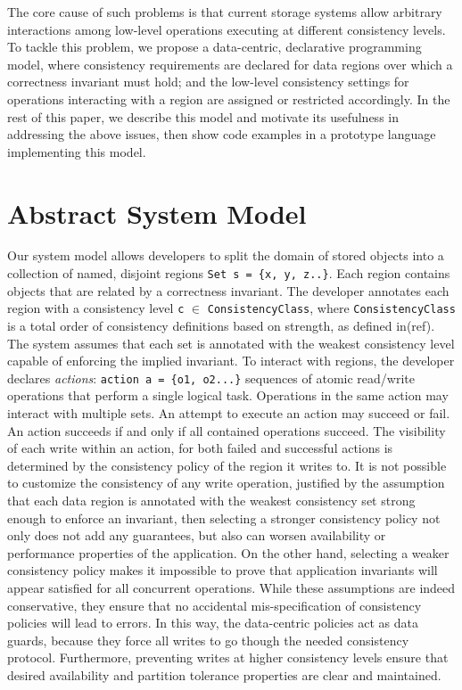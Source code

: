 \documentclass[preprint, numbers]{sigplanconf}
\begin{document}
The core cause of such problems is that current storage systems allow arbitrary
interactions among low-level operations executing at different consistency levels. To
tackle this problem, we propose a data-centric, declarative programming model, where
consistency requirements are declared for data regions over which a correctness
invariant must hold; and the low-level consistency settings for operations interacting with
a region are assigned or restricted accordingly. In the rest of this paper, we describe this
model and motivate its usefulness in addressing the above issues, then show
code examples in a prototype language implementing this model.

\section{Abstract System Model}
Our system model allows developers to split the domain of stored objects into a
collection of named, disjoint
regions \texttt{Set s = \{x, y, z..\}}. Each
region contains objects that are related by a correctness invariant. The
developer annotates each region with a consistency level \texttt{c} $\in$
\texttt{ConsistencyClass}, where \texttt{ConsistencyClass} is a total order of
consistency definitions based on strength, as defined in(ref). The system assumes that each
set is annotated with the weakest consistency level capable of
enforcing the implied invariant. To interact with regions, the developer
declares \emph{actions}: \texttt{action a = \{o1, o2...\}} sequences of atomic
read/write operations that perform a single logical task.
Operations in the same action may interact with multiple sets. An attempt to execute an action may succeed or fail.
An action succeeds if and only if all contained operations succeed. The visibility
of each write within an action, for both failed and successful
actions is determined by the consistency policy of the region it writes to. It
is not possible to customize the consistency of any write operation, justified
by the assumption that each data region is annotated with the weakest
consistency set strong enough to enforce an invariant, then selecting a stronger
consistency policy not only does not add any guarantees, but also can worsen
availability or performance properties of the application. On the other hand,
selecting a weaker consistency policy makes it impossible to prove that
application invariants will appear satisfied for all concurrent operations.
While these assumptions are indeed conservative, they ensure that no accidental
mis-specification of consistency policies will lead to errors. In this way, the
data-centric policies act as data guards, because they force all writes to go
though the needed consistency protocol. Furthermore, preventing writes at higher
consistency levels ensure that desired availability and partition tolerance
properties are clear and maintained. 
\end{document}
